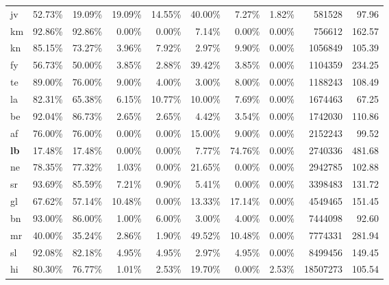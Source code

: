 \begin{table*}[hbt!]
{\begin{tabular}{l|rrrr|rrr|rr}
            jv                & 52.73\% & 19.09\% & 19.09\% & 14.55\% & 40.00\% & 7.27\%  & 1.82\% & 581528       & 97.96      \\
            km                & 92.86\% & 92.86\% & 0.00\%  & 0.00\%  & 7.14\%  & 0.00\%  & 0.00\% & 756612       & 162.57     \\
            kn                & 85.15\% & 73.27\% & 3.96\%  & 7.92\%  & 2.97\%  & 9.90\%  & 0.00\% & 1056849      & 105.39     \\
            fy                & 56.73\% & 50.00\% & 3.85\%  & 2.88\%  & 39.42\% & 3.85\%  & 0.00\% & 1104359      & 234.25     \\
            te                & 89.00\% & 76.00\% & 9.00\%  & 4.00\%  & 3.00\%  & 8.00\%  & 0.00\% & 1188243      & 108.49     \\
            la                & 82.31\% & 65.38\% & 6.15\%  & 10.77\% & 10.00\% & 7.69\%  & 0.00\% & 1674463      & 67.25      \\
            be                & 92.04\% & 86.73\% & 2.65\%  & 2.65\%  & 4.42\%  & 3.54\%  & 0.00\% & 1742030      & 110.86     \\
            af                & 76.00\% & 76.00\% & 0.00\%  & 0.00\%  & 15.00\% & 9.00\%  & 0.00\% & 2152243      & 99.52      \\
            \textbf{lb}       & 17.48\% & 17.48\% & 0.00\%  & 0.00\%  & 7.77\%  & 74.76\% & 0.00\% & 2740336      & 481.68     \\
            ne                & 78.35\% & 77.32\% & 1.03\%  & 0.00\%  & 21.65\% & 0.00\%  & 0.00\% & 2942785      & 102.88     \\
            sr                & 93.69\% & 85.59\% & 7.21\%  & 0.90\%  & 5.41\%  & 0.00\%  & 0.00\% & 3398483      & 131.72     \\
            gl                & 67.62\% & 57.14\% & 10.48\% & 0.00\%  & 13.33\% & 17.14\% & 0.00\% & 4549465      & 151.45     \\
            bn                & 93.00\% & 86.00\% & 1.00\%  & 6.00\%  & 3.00\%  & 4.00\%  & 0.00\% & 7444098      & 92.60      \\
            mr                & 40.00\% & 35.24\% & 2.86\%  & 1.90\%  & 49.52\% & 10.48\% & 0.00\% & 7774331      & 281.94     \\
            sl                & 92.08\% & 82.18\% & 4.95\%  & 4.95\%  & 2.97\%  & 4.95\%  & 0.00\% & 8499456      & 149.45     \\
            hi                & 80.30\% & 76.77\% & 1.01\%  & 2.53\%  & 19.70\% & 0.00\%  & 2.53\% & 18507273     & 105.54     \\

\end{tabular}}
\end{table*}
